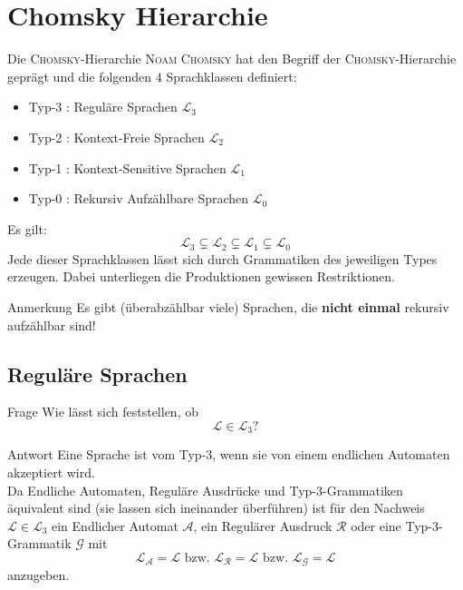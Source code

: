 \documentclass[]{beamer}
\begin{document}
\section{Chomsky Hierarchie}
\begin{frame}[squeeze]{}
  \begin{block}{Die \textsc{Chomsky}-Hierarchie}
    \textsc{Noam Chomsky} hat den Begriff der \textsc{Chomsky}-Hierarchie geprägt und die folgenden $4$ Sprachklassen definiert:
    \begin{itemize}
      \item Typ-3 : Reguläre Sprachen $\mathcal{L}_3$
      \item Typ-2 : Kontext-Freie Sprachen $\mathcal{L}_2$
      \item Typ-1 : Kontext-Sensitive Sprachen $\mathcal{L}_1$
      \item Typ-0 : Rekursiv Aufzählbare Sprachen $\mathcal{L}_0$
    \end{itemize}
    \vspace*{0.5em}
    \pause
    Es gilt:
    \[\mathcal{L}_3 \subsetneq \mathcal{L}_2 \subsetneq \mathcal{L}_1 \subsetneq \mathcal{L}_0\]
    \pause
    Jede dieser Sprachklassen lässt sich durch Grammatiken des jeweiligen Types erzeugen. Dabei unterliegen die Produktionen gewissen Restriktionen.
  \end{block}
  
  \pause
  
  \begin{alertblock}{Anmerkung}
    Es gibt (überabzählbar viele) Sprachen, die \textbf{nicht einmal} rekursiv aufzählbar sind!
  \end{alertblock}
\end{frame}

\subsection{Reguläre Sprachen}
\begin{frame}[squeeze]{}
  \begin{alertblock}{Frage}
    Wie lässt sich feststellen, ob
      \[\mathcal{L} \in \mathcal{L}_3 \text{?}\]
  \end{alertblock}
  
  \pause
  
  \begin{exampleblock}{Antwort}
    Eine Sprache ist vom Typ-3, wenn sie von einem endlichen Automaten akzeptiert wird. \\
    \vspace*{0.5em}
    \pause
    Da Endliche Automaten, Reguläre Ausdrücke und Typ-3-Grammatiken äquivalent sind (sie lassen sich ineinander überführen) ist für den Nachweis $\mathcal{L} \in \mathcal{L}_3$ ein Endlicher Automat $\mathcal{A}$, ein Regulärer Ausdruck $\mathcal{R}$ oder eine Typ-3-Grammatik $\mathcal{G}$ mit
      \[\mathcal{L_A} = \mathcal{L} \text{ bzw. } \mathcal{L_R} = \mathcal{L} \text{ bzw. } \mathcal{L_G} = \mathcal{L}\]
    anzugeben.
  \end{exampleblock}
\end{frame}
\end{document}

